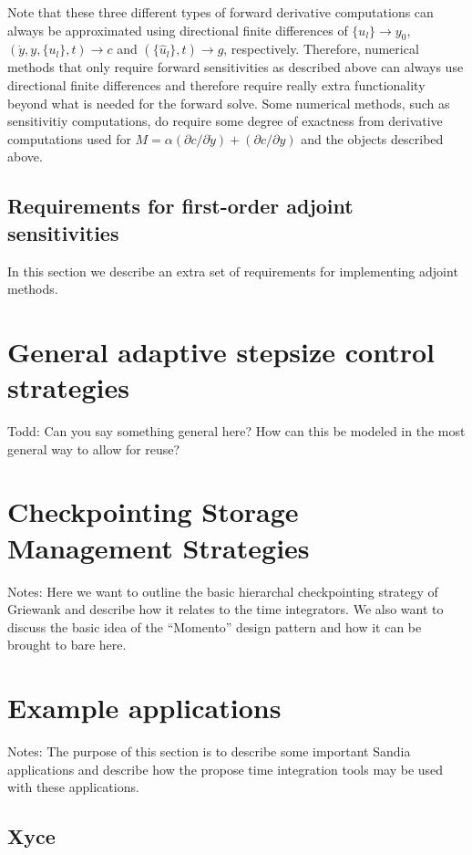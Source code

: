 \documentclass[pdf,ps2pdf,11pt]{SANDreport}
\begin{document}
Note that these three different types of forward derivative computations can
always be approximated using directional finite differences of $\{u_l\}
{}\rightarrow y_0$, $(\dot{y},y,\{u_l\},t) {}\rightarrow c$ and
$(\{\hat{u}_l\},t) {}\rightarrow g$, respectively.  Therefore, numerical
methods that only require forward sensitivities as described above can always
use directional finite differences and therefore require really extra
functionality beyond what is needed for the forward solve.  Some numerical
methods, such as sensitivitiy computations, do require some degree of
exactness from derivative computations used for $M = {}\alpha ({}\partial c /
{}\partial {}\dot{y}) + ({}\partial c / {}\partial y)$ and the objects
described above.

\subsection{Requirements for first-order adjoint sensitivities}

In this section we describe an extra set of requirements for implementing
adjoint methods.

\section{General adaptive stepsize control strategies}

Todd: Can you say something general here?  How can this be modeled in the most
general way to allow for reuse?

\section{Checkpointing Storage Management Strategies}

Notes: Here we want to outline the basic hierarchal checkpointing strategy of
Griewank and describe how it relates to the time integrators.  We also want to
discuss the basic idea of the ``Momento'' design pattern and how it can be
brought to bare here.

\section{Example applications}

Notes: The purpose of this section is to describe some important Sandia
applications and describe how the propose time integration tools may be used
with these applications.

\subsection{Xyce}
\end{document}
